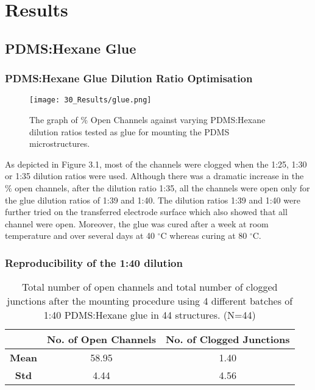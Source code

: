 \chapter{Results}
\label{ch:Results}



\section{PDMS:Hexane Glue}

\subsection{PDMS:Hexane Glue Dilution Ratio Optimisation}
\label{ch:Results}
\begin{figure}[H]
\centering
\texttt{[image: 30\_Results/glue.png]}
\caption{The graph of $\%$ Open Channels against varying PDMS:Hexane dilution ratios tested as glue for mounting the PDMS microstructures.}
\label{fig:Glue Dilutions}
\end{figure}

As depicted in Figure 3.1, most of the channels were clogged when the 1:25, 1:30 or 1:35 dilution ratios were used. Although there was a dramatic increase in the $\%$ open channels, after the dilution ratio 1:35, all the channels were open only for the glue dilution ratios of 1:39 and 1:40. The dilution ratios 1:39 and 1:40 were further tried on the transferred electrode surface which also showed that all channel were open. Moreover, the glue was cured after a week at room temperature and over several days at 40 $^{\circ}$C whereas curing at 80 $^{\circ}$C.


\subsection{Reproducibility of the 1:40 dilution}

\begin{table}[H]
\begin{center}
 \begin{tabular}{||c|c|c||} 
 \hline
 & \textbf{No. of Open Channels} & \textbf{No. of Clogged Junctions} \\ [0.5ex] 
 \hline\hline
 \textbf{Mean} & 58.95 & 1.40 \\ 
 \hline
 \textbf{Std} & 4.44 & 4.56 \\
 \hline
\end{tabular}
\end{center}
\caption{Total number of open channels and total number of clogged junctions after the mounting procedure using 4 different batches of 1:40 PDMS:Hexane glue in 44 structures. (N=44)}
\label{table:1}
\end{table}


